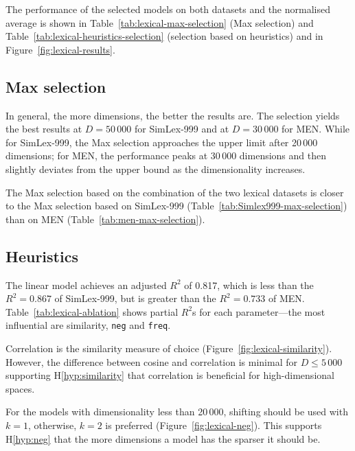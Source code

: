 The performance of the selected models on both datasets and the normalised average is shown in Table~\ref{tab:lexical-max-selection} (Max selection) and Table~\ref{tab:lexical-heuristics-selection} (selection based on heuristics) and in Figure~\ref{fig:lexical-results}.



\subsection{Max selection}
\label{sec:max-selection}

In general, the more dimensions, the better the results are. The selection yields the best results at $D = 50\,000$ for SimLex-999 and at $D = 30\,000$ for MEN. While for SimLex-999, the Max selection approaches the upper limit after 20\,000 dimensions; for MEN, the performance peaks at 30\,000 dimensions and then slightly deviates from the upper bound as the dimensionality increases.

The Max selection based on the combination of the two lexical datasets is closer to the Max selection based on SimLex-999 (Table~\ref{tab:Simlex999-max-selection}) than on MEN (Table~\ref{tab:men-max-selection}).



\subsection{Heuristics}

The linear model achieves an adjusted $R^2$ of 0.817, which is less than the $R^2 = 0.867$ of SimLex-999, but is greater than the $R^2 = 0.733$ of MEN. Table~\ref{tab:lexical-ablation} shows partial $R^2$s for each parameter---the most influential are similarity, \texttt{neg} and \texttt{freq}.


Correlation is the similarity measure of choice (Figure~\ref{fig:lexical-similarity}). However, the difference between cosine and correlation is minimal for $D \leq 5\,000$ supporting H\ref{hyp:similarity} that correlation is beneficial for high-dimensional spaces.



For the models with dimensionality less than 20\,000, shifting should be used with $k = 1$, otherwise, $k = 2$ is preferred (Figure~\ref{fig:lexical-neg}). This supports H\ref{hyp:neg} that the more dimensions a model has the sparser it should be.


